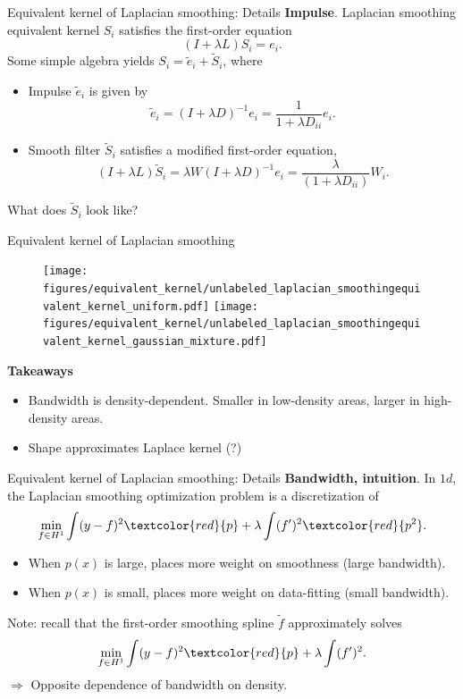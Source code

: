 \documentclass[xcolor=dvipsnames]{beamer}
\newcommand{\wt}[1]{\widetilde{#1}}
\begin{document}
\begin{frame}[t]{Equivalent kernel of Laplacian smoothing: Details}
\textbf{Impulse}. Laplacian smoothing equivalent kernel $S_i$ satisfies the first-order equation
\begin{equation*}
(I + \lambda L)S_i = e_i.
\end{equation*}
\pause
Some simple algebra yields $S_i = \wt{e}_i + \wt{S}_i$, where
\begin{itemize}
	\item \alert{Impulse} $\wt{e}_i$ is given by
	\begin{equation*}
	\wt{e}_i = (I + \lambda D)^{-1} e_i = \frac{1}{1 + \lambda D_{ii}} e_i.
	\end{equation*}
	\item Smooth \alert{filter} $\wt{S}_i$ satisfies a modified first-order equation,
	\begin{equation*}
	(I + \lambda L)\wt{S}_i = \lambda W (I + \lambda D)^{-1} e_i = \frac{\lambda}{(1 + \lambda D_{ii})} W_i.
	\end{equation*}
\end{itemize}
What does $\wt{S}_i$ look like?
\end{frame}

\begin{frame}[t]{Equivalent kernel of Laplacian smoothing}
\begin{figure}
	\texttt{[image: figures/equivalent\_kernel/unlabeled\_laplacian\_smoothingequivalent\_kernel\_uniform.pdf]}
	\texttt{[image: figures/equivalent\_kernel/unlabeled\_laplacian\_smoothingequivalent\_kernel\_gaussian\_mixture.pdf]}
\end{figure}
\textbf{Takeaways}
\begin{itemize}
	\item \alert{Bandwidth} is density-dependent. Smaller in low-density areas, larger in high-density areas.
	\item \alert{Shape} approximates Laplace kernel (?)
\end{itemize}
\end{frame}

\begin{frame}[t]{Equivalent kernel of Laplacian smoothing: Details}
\textbf{Bandwidth, intuition}. In $1d$, the Laplacian smoothing optimization problem is a discretization of 
\begin{equation*}
\min_{f \in H^1}\int (y - f)^2 \textcolor{red}{p} + \lambda \int (f')^2 \textcolor{red}{p^2}.
\end{equation*}
\begin{itemize}
	\item When $p(x)$ is large, places more weight on smoothness (large bandwidth).
	\item When $p(x)$ is small, places more weight on data-fitting (small bandwidth).
\end{itemize}
\pause
Note: recall that the first-order smoothing spline $\wt{f}$ approximately solves
\begin{equation*}
\min_{f \in H^1}\int (y - f)^2 \textcolor{red}{p} + \lambda \int (f')^2.
\end{equation*}
$\Longrightarrow$ Opposite dependence of bandwidth on density. 
\end{frame}
\end{document}
